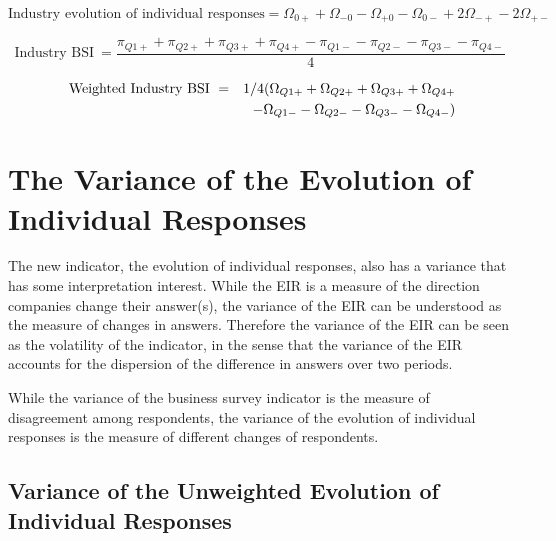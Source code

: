 \documentclass[12pt,a4paper,oneside]{book}
\begin{document}
\begin{equation}
    \text{Industry evolution of individual responses} = \Omega_{0+} + \Omega_{-0} - \Omega_{+0} - \Omega_{0-} +2\Omega_{-+} -2\Omega_{+-} 
\end{equation}



\begin{equation}
    \mbox{Industry BSI}\ = \frac{\pi_{Q1+} + \pi_{Q2+} + \pi_{Q3+} + \pi_{Q4+} - \pi_{Q1-} - \pi_{Q2-} - \pi_{Q3-} - \pi_{Q4-} }{4}
\end{equation}


\begin{eqnarray}
    \mbox{ Weighted Industry BSI}\ &=& 1/4 ( \Omega_{Q1+} + \Omega_{Q2+} + \Omega_{Q3+} + \Omega_{Q4+} \\
    && - \Omega_{Q1-} - \Omega_{Q2-} - \Omega_{Q3-} - \Omega_{Q4-} \Large) 
\end{eqnarray}



\chapter{The Variance of the Evolution of Individual Responses} \label{Chapter:Var Z}

The new indicator, the evolution of individual responses, also has a variance that has some interpretation interest. 
While the EIR is a measure of the direction companies change their answer(s), the variance of the EIR can be understood as the measure of changes in answers. 
Therefore the variance of the EIR can be seen as the volatility of the indicator, in the sense that the variance of the EIR accounts for the dispersion of the difference in answers over two periods.

While the variance of the business survey indicator is the measure of disagreement among respondents, the variance of the evolution of individual responses is the measure of different changes of respondents.


\section{Variance of the Unweighted Evolution of Individual Responses}
\end{document}
